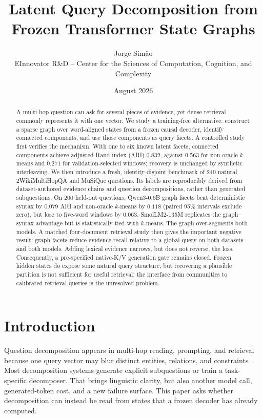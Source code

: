 \documentclass[11pt]{article}
\title{Latent Query Decomposition from Frozen Transformer State Graphs}
\author{Jorge Sim\~ao\\EInnovator R\&D -- Center for the Sciences of Computation, Cognition, and Complexity}
\date{August 2026}
\begin{document}
\maketitle

\begin{abstract}
A multi-hop question can ask for several pieces of evidence, yet dense retrieval commonly represents it with one vector. We study a training-free alternative: construct a sparse graph over word-aligned states from a frozen causal decoder, identify connected components, and use those components as query facets. A controlled study first verifies the mechanism. With one to six known latent facets, connected components achieve adjusted Rand index (ARI) $0.832$, against $0.563$ for non-oracle $k$-means and $0.271$ for validation-selected windows; recovery is unchanged by synthetic interleaving. We then introduce a fresh, identity-disjoint benchmark of 240 natural 2WikiMultiHopQA and MuSiQue questions. Its labels are reproducibly derived from dataset-authored evidence chains and question decompositions, rather than generated subquestions. On 200 held-out questions, Qwen3-0.6B graph facets beat deterministic syntax by $0.079$ ARI and non-oracle $k$-means by $0.118$ (paired 95\% intervals exclude zero), but lose to five-word windows by $0.063$. SmolLM2-135M replicates the graph--syntax advantage but is statistically tied with $k$-means. The graph over-segments both models. A matched four-document retrieval study then gives the important negative result: graph facets reduce evidence recall relative to a global query on both datasets and both models. Adding lexical evidence narrows, but does not reverse, the loss. Consequently, a pre-specified native-K/V generation gate remains closed. Frozen hidden states do expose some natural query structure, but recovering a plausible partition is not sufficient for useful retrieval; the interface from communities to calibrated retrieval queries is the unresolved problem.
\end{abstract}

\section{Introduction}
Question decomposition appears in multi-hop reading, prompting, and retrieval because one query vector may blur distinct entities, relations, and constraints~\cite{min2019decomposition,zhou2023least,khot2023decomposed,press2023compositionality,ammann2025question}. Most decomposition systems generate explicit subquestions or train a task-specific decomposer. That brings linguistic clarity, but also another model call, generated-token cost, and a new failure surface. This paper asks whether decomposition can instead be read from states that a frozen decoder has already computed.
\end{document}
